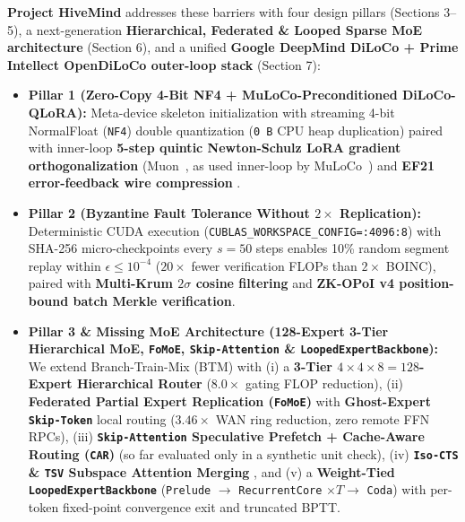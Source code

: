 \documentclass[11pt,a4paper]{article}
\begin{document}
\textbf{Project HiveMind} addresses these barriers with four design pillars (Sections 3--5), a next-generation \textbf{Hierarchical, Federated \& Looped Sparse MoE architecture} (Section 6), and a unified \textbf{Google DeepMind DiLoCo + Prime Intellect OpenDiLoCo outer-loop stack} (Section 7):

\begin{itemize}[leftmargin=1.8em]
    \item \textbf{Pillar 1 (Zero-Copy 4-Bit NF4 + MuLoCo-Preconditioned DiLoCo-QLoRA):} Meta-device skeleton initialization with streaming 4-bit NormalFloat (\texttt{NF4}) double quantization (\texttt{0\,B} CPU heap duplication) paired with inner-loop \textbf{5-step quintic Newton-Schulz LoRA gradient orthogonalization} (Muon~\cite{jordan2024muon}, as used inner-loop by MuLoCo~\cite{therien2025muloco,belilovsky2026inner}) and \textbf{EF21 error-feedback wire compression} \cite{richtarik2021ef21,sarfi2025sparseloco,peng2024demo}.
    \item \textbf{Pillar 2 (Byzantine Fault Tolerance Without $2\times$ Replication):} Deterministic CUDA execution (\texttt{CUBLAS\_WORKSPACE\_CONFIG=:4096:8}) with SHA-256 micro-checkpoints every $s=50$ steps enables 10\% random segment replay within $\epsilon \le 10^{-4}$ ($20\times$ fewer verification FLOPs than $2\times$ BOINC), paired with \textbf{Multi-Krum $2\sigma$ cosine filtering} \cite{blanchard2017krum} and \textbf{ZK-OPoI v4 position-bound batch Merkle verification}.
    \item \textbf{Pillar 3 \& Missing MoE Architecture (128-Expert 3-Tier Hierarchical MoE, \texttt{FoMoE}, \texttt{Skip-Attention} \& \texttt{LoopedExpertBackbone}):} We extend Branch-Train-Mix (BTM) \cite{sukhbaatar2024btm} with (i) a \textbf{3-Tier $4 \times 4 \times 8 = 128$-Expert Hierarchical Router} ($8.0\times$ gating FLOP reduction), (ii) \textbf{Federated Partial Expert Replication (\texttt{FoMoE})} \cite{sani2026fomoe} with \textbf{Ghost-Expert \texttt{Skip-Token}} local routing ($3.46\times$ WAN ring reduction, zero remote FFN RPCs), (iii) \textbf{\texttt{Skip-Attention} Speculative Prefetch + Cache-Aware Routing (\texttt{CAR})} \cite{merolla2025fomoe} (so far evaluated only in a synthetic unit check), (iv) \textbf{\texttt{Iso-CTS} \& \texttt{TSV} Subspace Attention Merging} \cite{marczak2025iso,horoi2026isoloco,gargiulo2024tsv}, and (v) a \textbf{Weight-Tied \texttt{LoopedExpertBackbone}} (\texttt{Prelude} $\to$ \texttt{RecurrentCore} $\times T \to$ \texttt{Coda}) \cite{loopedmoe2026,loopedfp2026} with per-token fixed-point convergence exit and truncated BPTT.

\end{itemize}
\end{document}
